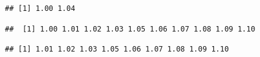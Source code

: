 \documentclass[12pt]{book}\usepackage{knitr}
\begin{document}
\begin{knitrout}
\begin{kframe}
\begin{alltt}
\end{alltt}
\begin{verbatim}
## [1] 1.00 1.04
\end{verbatim}
\begin{alltt}
\hlstd{X[}\hlopt{-}\hlstd{]}  
\end{alltt}
\begin{verbatim}
##  [1] 1.00 1.01 1.02 1.03 1.05 1.06 1.07 1.08 1.09 1.10
\end{verbatim}
\begin{alltt}
\hlstd{X[}\hlopt{-}\hlstd{(}\hlstd{,}\hlstd{)]} 
\end{alltt}
\begin{verbatim}
## [1] 1.01 1.02 1.03 1.05 1.06 1.07 1.08 1.09 1.10
\end{verbatim}
\end{kframe}
\end{knitrout}
\end{document}
